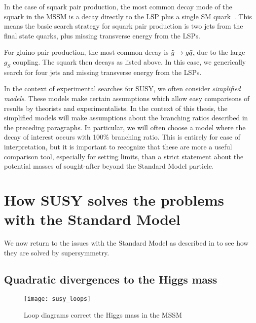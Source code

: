 In the case of squark pair production, the most common decay mode of the squark in the MSSM is a decay directly to the LSP plus a single SM quark~\cite{susyPrimer}.
This means the basic search strategy for squark pair production is two jets from the final state quarks, plus missing transverse energy from the LSPs.

For gluino pair production, the most common decay is $\tilde{g} \rightarrow g \tilde{q}$, due to the large $g_S$ coupling.
The squark then decays as listed above.
In this case, we generically search for four jets and missing transverse energy from the LSPs.

In the context of experimental searches for SUSY, we often consider \textit{simplified models}.
These models make certain assumptions which allow easy comparisons of results by theorists and experimentalists.
In the context of this thesis, the simplified models will make assumptions about the branching ratios described in the preceding paragraphs.
In particular, we will often choose a model where the decay of interest occurs with 100\% branching ratio.
This is entirely for ease of interpretation, but it is important to recognize that these are more a useful comparison tool, especially for setting limits, than a strict statement about the potential masses of sought-after beyond the Standard Model particle.

\section{How SUSY solves the problems with the Standard Model}

We now return to the issues with the Standard Model as described in  to see how they are solved by supersymmetry.

\subsection{Quadratic divergences to the Higgs mass}

\begin{figure}[tbp]
\caption{Loop diagrams correct the Higgs mass in the MSSM}\label{fig:susy_loops}
\texttt{[image: susy\_loops]}
\end{figure}

